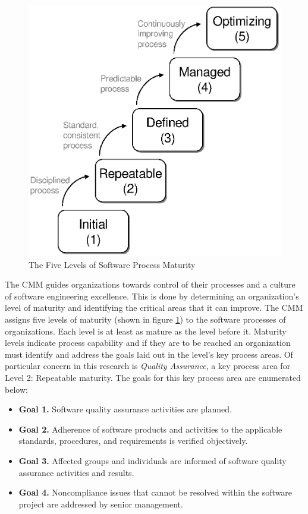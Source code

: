 \begin{figure}[t]
\begin{center}
\includegraphics{figures/CMMMaturityLevels.eps}
\end{center}
\caption{The Five Levels of Software Process Maturity}
\label{fig:cmm-levels}
\end{figure}

The CMM guides organizations towards control of their processes and a culture of
software engineering excellence. This is done by determining an organization's
level of maturity and identifying the critical areas that it can improve. The
CMM assigns five levels of maturity (shown in figure \ref{fig:cmm-levels}) to
the software processes of organizations. Each level is at least as mature as the
level before it. Maturity levels indicate process capability and if they are to
be reached an organization must identify and address the goals laid out in the
level's key process areas. Of particular concern in this research is
\textit{Quality Assurance}, a key process area for Level 2: Repeatable maturity.
The goals for this key process area are enumerated below: \singlespace
\begin{itemize}
  \item \textbf{Goal 1.} Software quality assurance activities are planned.
  \item \textbf{Goal 2.} Adherence of software products and activities to the
        applicable standards, procedures, and requirements is verified
        objectively.
  \item \textbf{Goal 3.} Affected groups and individuals are informed of
        software quality assurance activities and results.
  \item \textbf{Goal 4.} Noncompliance issues that cannot be resolved within
        the software project are addressed by senior management.
\end{itemize}\doublespace

